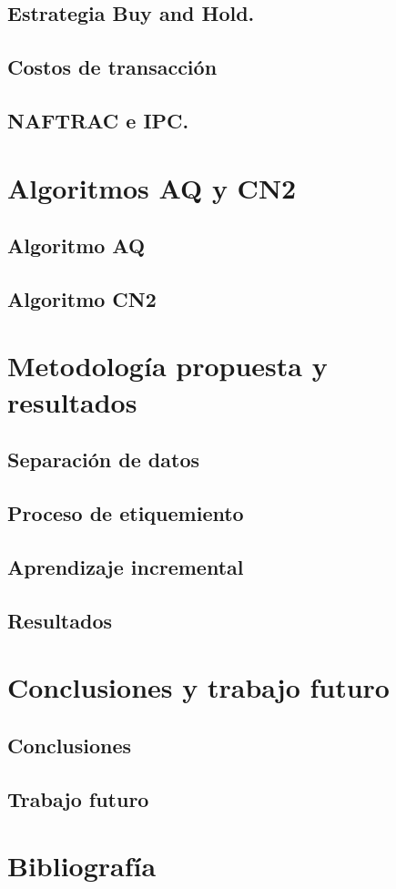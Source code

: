 \documentclass[onesided, 12pt]{scrbook}
\theoremstyle{break}
\begin{document}
\section{Estrategia Buy and Hold.}
\section{Costos de transacción}
\section{NAFTRAC e IPC.}


\chapter{Algoritmos AQ y CN2}
\section{Algoritmo AQ}
\section{Algoritmo CN2}

\chapter{Metodología propuesta y resultados}
\section{Separación de datos}
\section{Proceso de etiquemiento}
\section{Aprendizaje incremental}
\section{Resultados}

\chapter{Conclusiones y trabajo futuro}
\section{Conclusiones}
\section{Trabajo futuro}

\chapter{Bibliografía}
\end{document}

